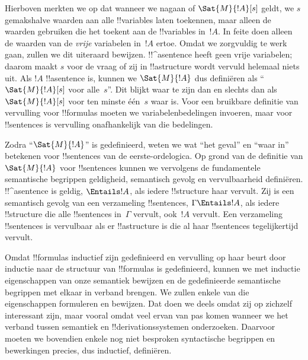 \documentclass[openany]{memoir}
\begin{document}


Hierboven merkten we op dat wanneer we nagaan of $\Sat{M}{!A}[s]$
geldt, we $s$ gemakshalve waarden aan alle !!{variable}s laten
toekennen, maar alleen de waarden gebruiken die het toekent aan de
!!{variable}s in~$!A$. In feite doen alleen de waarden van de
\emph{vrije} variabelen in~$!A$ ertoe. Omdat we zorgvuldig te werk
gaan, zullen we dit uiteraard bewijzen. !!^a{sentence} heeft geen vrije
variabelen; daarom maakt $s$ voor de vraag of zij in !!a{structure}
wordt vervuld helemaal niets uit. Als $!A$ !!a{sentence} is, kunnen we
$\Sat{M}{!A}$ dus definiëren als ``$\Sat{M}{!A}[s]$ voor alle~$s$''.
Dit blijkt waar te zijn dan en slechts dan als $\Sat{M}{!A}[s]$ voor
ten minste één~$s$ waar is. Voor een bruikbare definitie van vervulling
voor !!{formula}s moeten we variabelenbedelingen invoeren, maar voor
!!{sentence}s is vervulling onafhankelijk van die bedelingen.

Zodra ``$\Sat{M}{!A}$'' is gedefinieerd, weten we wat ``het geval'' en
``waar in'' betekenen voor !!{sentence}s van de eerste-ordelogica. Op
grond van de definitie van $\Sat{M}{!A}$ voor !!{sentence}s kunnen we
vervolgens de fundamentele semantische begrippen geldigheid, semantisch
gevolg en vervulbaarheid definiëren. !!^a{sentence} is geldig,
$\Entails !A$, als iedere !!{structure} haar vervult. Zij is een
semantisch gevolg van een verzameling !!{sentence}s,
$\Gamma \Entails !A$, als iedere !!{structure} die alle !!{sentence}s
in~$\Gamma$ vervult, ook~$!A$ vervult. Een verzameling !!{sentence}s is
vervulbaar als er !!a{structure} is die al haar !!{sentence}s
tegelijkertijd vervult.

Omdat !!{formula}s inductief zijn gedefinieerd en vervulling op haar
beurt door inductie naar de structuur van !!{formula}s is gedefinieerd,
kunnen we met inductie eigenschappen van onze semantiek bewijzen en de
gedefinieerde semantische begrippen met elkaar in verband brengen. We
zullen enkele van die eigenschappen formuleren en bewijzen. Dat doen we
deels omdat zij op zichzelf interessant zijn, maar vooral omdat veel
ervan van pas komen wanneer we het verband tussen semantiek en
!!{derivation}ssystemen onderzoeken. Daarvoor moeten we bovendien enkele
nog niet besproken syntactische begrippen en bewerkingen precies, dus
inductief, definiëren.
\endgroup

\begingroup
\def\olfilename{OLP-0146}
\def\olfilepath{content/first-order-logic/introduction/}
\hypertarget{unit-OLP-0146}{}
\end{document}
